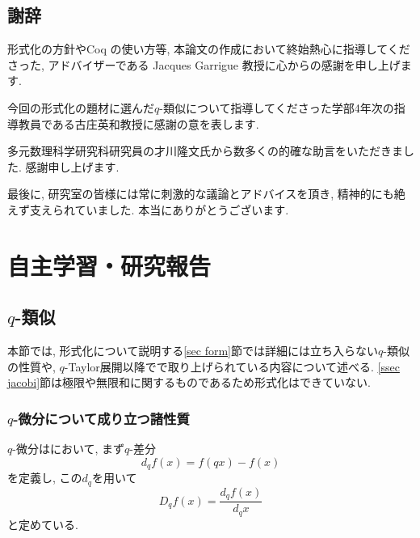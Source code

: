 \documentclass[11pt]{jsreport}
\theoremstyle{mystyle}
\newcommand{\0}{\textbf{0}}
\begin{document}
\section*{謝辞}
形式化の方針やCoq の使い方等, 本論文の作成において終始熱心に指導してくださった, アドバイザーである Jacques Garrigue 教授に心からの感謝を申し上げます. 

今回の形式化の題材に選んだ$q$-類似について指導してくださった学部4年次の指導教員である古庄英和教授に感謝の意を表します. 

多元数理科学研究科研究員の才川隆文氏から数多くの的確な助言をいただきました. 感謝申し上げます. 

最後に, 研究室の皆様には常に刺激的な議論とアドバイスを頂き, 精神的にも絶えず支えられていました. 本当にありがとうございます. 
\chapter{自主学習・研究報告} \label{chap thesis}
\section{$q$-類似} \label{sec qana}
本節では, 形式化について説明する\ref{sec form}節では詳細には立ち入らない$q$-類似の性質や, $q$-Taylor展開以降で\cite{Kac}で取り上げられている内容について述べる. 
\ref{ssec jacobi}節は極限や無限和に関するものであるため形式化はできていない. 
\subsection{$q$-微分について成り立つ諸性質} \label{ssec qprops}
$q$-微分は\cite{Kac}において, まず$q$-差分
\[
  d_q f(x) = f(qx) - f(x)
\]
を定義し, この$d_q$を用いて
\[
  D_q f(x) = \frac{d_q f(x)}{d_q x}
\]
と定めている. 
\end{document}
